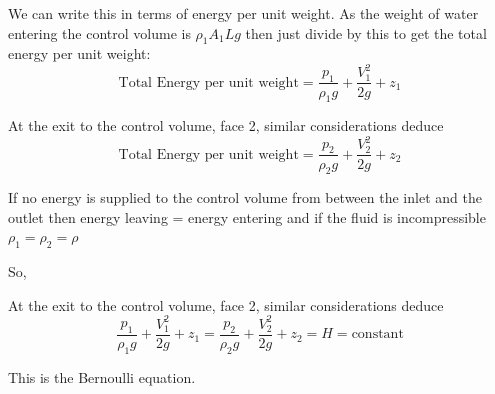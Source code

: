 \documentclass[a4paper, 12pt, british]{article} %
\numberwithin{equation}{section}
\numberwithin{figure}{section}
\numberwithin{table}{section}
\begin{document}
 

We can write this in terms of energy per unit weight. As the weight of water entering the control volume is $\rho_1 A_1 L g$ then just divide by this to get the total energy per unit weight: 
 \begin{equation}
 \text{Total Energy per unit weight} = \frac{p_1}{\rho_1 g}  + \frac{V_1^2}{2g} + z_1 
 \end{equation}
 

At the exit to the control volume, face 2, similar considerations deduce
  \begin{equation}
 \text{Total Energy per unit weight} = \frac{p_2}{\rho_2 g}  + \frac{V_2^2}{2g} + z_2 
 \end{equation}

If no energy is supplied to  the control volume from between the inlet and the outlet then energy leaving = energy entering and if the fluid is incompressible $\rho_1 = \rho_2 = \rho$ 

So, 

 At the exit to the control volume, face 2, similar considerations deduce
 \begin{equation}
\frac{p_1}{\rho_1 g}  + \frac{V_1^2}{2g} + z_1  = \frac{p_2}{\rho_2 g}  + \frac{V_2^2}{2g} + z_2 = H = \text{constant}
\label{eq:bernoulli}
 \end{equation}

This is the Bernoulli equation.
\end{document}
